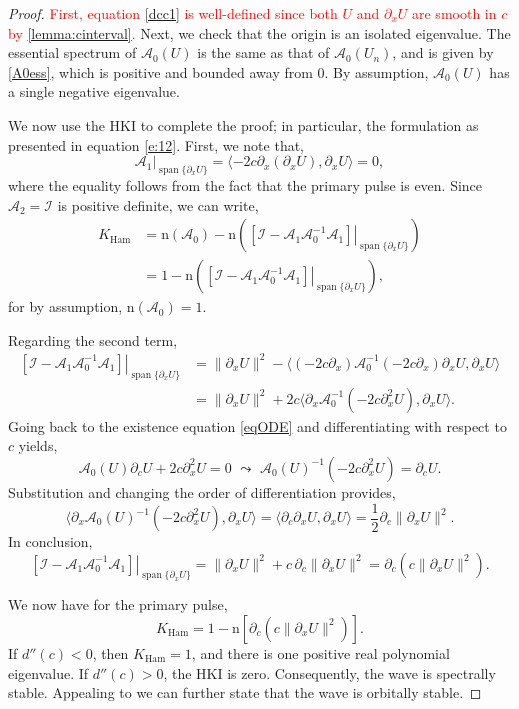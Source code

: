 \documentclass[review,onefignum,onetabnum]{siamart171218}
\def\Ham{\mathop\mathrm{Ham}\nolimits}
\def\Span{\mathop\mathrm{span}\nolimits}
\newcommand{\rmn}{\mathrm{n}}
\newcommand{\calA}{\mathcal{A}}
\newcommand{\calI}{\mathcal{I}}
\newcommand{\revised}[1]{ \textcolor{red}{#1} }
\begin{document}
\begin{proof}
\revised{
First, equation \cref{dcc1} is well-defined since both $U$ and $\partial_x U$ are smooth in $c$ by \cref{lemma:cinterval}.
}
Next, we check that the origin is an isolated eigenvalue. The essential spectrum of $\calA_0(U)$ is the same as that of $\calA_0(U_n)$, and is given by \cref{A0ess}, which is positive and bounded away from 0. By assumption, $\calA_0(U)$ has a single negative eigenvalue.

We now use the HKI to complete the proof; in particular, the formulation as presented in equation \cref{e:12}. First, we note that,
\[
\left.\calA_1\right|_{\Span\{\partial_xU\}}=
\langle-2c\partial_x\left(\partial_xU\right),\partial_xU\rangle=0,
\]
where the equality follows from the fact that the primary pulse is even. Since $\calA_2=\calI$ is positive definite, we can write,
\[
\begin{aligned}
K_{\Ham}&=\rmn(\calA_0)-
\rmn\left(\left.\left[\calI-\calA_1\calA_0^{-1}\calA_1\right]\right|_{\Span\{\partial_xU\}}\right)\\
&=1-
\rmn\left(\left.\left[\calI-\calA_1\calA_0^{-1}\calA_1\right]\right|_{\Span\{\partial_xU\}}\right),
\end{aligned}
\]
for by assumption, $\rmn(\calA_0)=1$.

Regarding the second term,
\[
\begin{aligned}
\left.\left[\calI-\calA_1\calA_0^{-1}\calA_1\right]\right|_{\Span\{\partial_xU\}}&=
\|\partial_xU\|^2-
\langle(-2c\partial_x)\calA_0^{-1}(-2c\partial_x)\partial_xU,\partial_xU\rangle\\
&=\|\partial_xU\|^2+
2c\langle\partial_x\calA_0^{-1}(-2c\partial_x^2U),\partial_xU\rangle.
\end{aligned}
\]
Going back to the existence equation \cref{eqODE} and differentiating with respect to $c$ yields,
\[
\calA_0(U)\partial_cU+2c\partial_x^2U=0\,\,\leadsto\,\,
\calA_0(U)^{-1}(-2c\partial_x^2U)=\partial_cU.
\]
Substitution and changing the order of differentiation provides,
\[
\langle\partial_x\calA_0(U)^{-1}(-2c\partial_x^2U),\partial_xU\rangle=
\langle\partial_c\partial_xU,\partial_xU\rangle=\frac{1}{2}\partial_c\|\partial_xU\|^2.
\]
In conclusion,
\[
\left.\left[\calI-\calA_1\calA_0^{-1}\calA_1\right]\right|_{\Span\{\partial_xU\}}=
\|\partial_xU\|^2+c\,\partial_c\|\partial_xU\|^2=
\partial_c\left( c\|\partial_xU\|^2 \right).
\]

We now have for the primary pulse,
\[
K_{\Ham}=1-\rmn\left[\partial_c\left( c\|\partial_xU\|^2 \right)\right].
\]
If $d''(c)<0$, then $K_{\Ham}=1$, and there is one positive real polynomial eigenvalue. If $d''(c)>0$, the HKI is zero. Consequently, the wave is spectrally stable. Appealing to \cite[Theorem~4.1]{bronski:aii14} we can further state that the wave is orbitally stable.
\end{proof}
\end{document}
